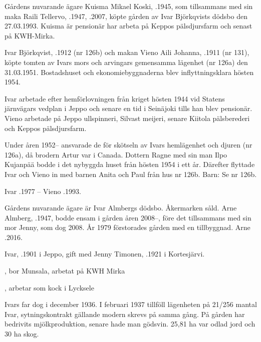 
Gårdens nuvarande ägare Kuisma Mikael Koski, .1945, som tillsammans med sin maka Raili Tellervo, .1947, .2007, köpte gården av Ivar Björkqvists dödsbo den 27.03.1993. Kuisma är pensionär har arbeta på Keppos pälsdjursfarm och senast på KWH-Mirka.


Ivar Björkqvist, .1912 (nr 126b) och makan Vieno Aili Johanna, .1911 (nr 131), köpte tomten av Ivars mors och arvingars gemensamma lägenhet (nr 126a) den 31.03.1951. Bostadshuset och ekonomiebyggnaderna blev inflyttningsklara hösten 1954.

Ivar arbetade efter hemförlovningen från kriget hösten  1944 vid Statens järnvägars vedplan i Jeppo och senare en tid i Seinäjoki tills han blev pensionär. Vieno arbetade på Jeppo ullspinneri, Silvast meijeri, senare Kiitola pälsberederi och Keppos pälsdjursfarm.

Under åren 1952-- ansvarade de för skötseln av Ivars hemlägenhet och djuren (nr 126a), då brodern Artur var i Canada. Dottern Ragne med sin man Ilpo Kujanpää bodde i det nybyggda huset från hösten 1954 i ett år. Därefter flyttade Ivar och Vieno in med barnen Anita och Paul från hus nr 126b. Barn: Se nr 126b.

Ivar .1977  --  Vieno .1993.




Gårdens nuvarande ägare är Ivar Almbergs dödsbo. Åkermarken såld. Arne Almberg, .1947, bodde ensam i gården åren 2008--, före det tillsammans med sin mor Jenny, som dog 2008. År 1979 förstorades gården med en tillbyggnad. Arne .2016.


Ivar, .1901 i Jeppo, gift med Jenny Timonen, .1921 i Kortesjärvi.
\begin{jhchildren}
  \item {}, bor Munsala, arbetat på KWH Mirka
  \item {}
  \item {}
  \item {}, arbetar som kock i Lycksele
\end{jhchildren}
Ivars far dog i december 1936. I februari 1937 tillföll lägenheten på 21/256 mantal Ivar, sytningskontrakt gällande modern skrevs på samma gång. På gården har bedrivits mjölkproduktion, senare hade man gödsvin. 25,81 ha var odlad jord och 30 ha skog.

